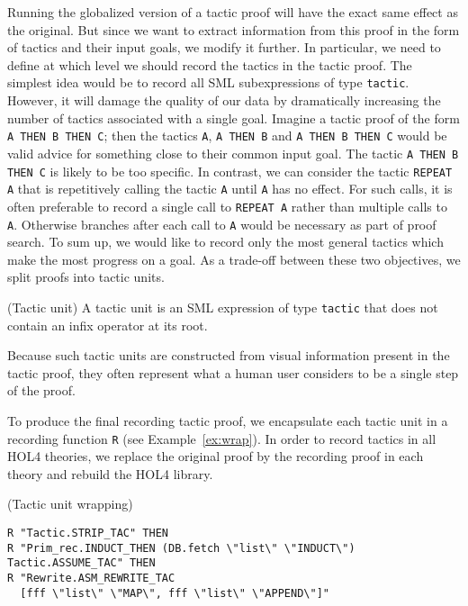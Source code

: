 \documentclass[runningheads,a4paper,draft]{svjour3}
\def\holfour{\textsf{HOL4}\xspace}
\def\sml{\textsf{SML}\xspace}
\begin{document}
Running the globalized version of a tactic proof will have the exact same
effect as the original. But since we want to extract information from this
proof in the form of tactics and their input goals, we modify it further.
In particular, we need to define at which level we should record the tactics in
the tactic proof. The simplest idea would be to record all \sml subexpressions
of type \texttt{tactic}. However, it will damage the quality of our data by
dramatically increasing the number of tactics associated with a single goal.
Imagine a tactic proof of the form \texttt{A THEN B THEN C}; then the tactics
\texttt{A}, \texttt{A THEN B} and \texttt{A THEN B THEN C} would be valid
advice for something close to their common input goal. The tactic
\texttt{A THEN B THEN C} is likely to be too specific. In contrast, we can
consider
the tactic \texttt{REPEAT A} that is repetitively calling the tactic \texttt{A}
until
\texttt{A} has no effect. For such calls, it is often preferable to record
a single call to \texttt{REPEAT A} rather than multiple calls to \texttt{A}.
Otherwise branches after each call to \texttt{A} would be necessary as part
of proof search.
To sum up, we would like to record only the most general tactics which
make the most progress on a goal. As a trade-off between these two objectives,
we split proofs into tactic units.

\begin{definition}(Tactic unit)
A tactic unit is an \sml expression of type \texttt{tactic} that does not
contain an
infix operator at its root.
\end{definition}

Because such tactic units are constructed from visual information present in
the tactic proof, they often represent what a human user considers to be a
single step of
the proof.

To produce the final recording tactic proof, we encapsulate each tactic unit
in a recording function \texttt{R} (see Example~\ref{ex:wrap}). In order to
record
tactics in all \holfour theories, we replace the original proof by the
recording proof in each theory and rebuild the \holfour library.

\begin{example}\label{ex:wrap} (Tactic unit wrapping)
\begin{lstlisting}[language=SMLSmall]
R "Tactic.STRIP_TAC" THEN
R "Prim_rec.INDUCT_THEN (DB.fetch \"list\" \"INDUCT\") Tactic.ASSUME_TAC" THEN
R "Rewrite.ASM_REWRITE_TAC
  [fff \"list\" \"MAP\", fff \"list\" \"APPEND\"]"
\end{lstlisting}
\end{example}
\end{document}
